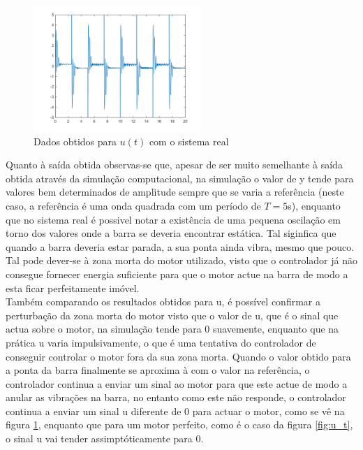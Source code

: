 \documentclass[%
  reprint,
  nofootinbib,
  amsmath,amssymb,
  aps,
  10pt,
  a4paper
]{revtex4-1}
\begin{document}
\begin{figure}[H]
\includegraphics[width=2.5in]{../img/u_dados_01.png}
\caption{Dados obtidos para $u(t)$ com o sistema real}
\label{fig:u_d}
\end{figure}
Quanto à saída obtida observas-se que, apesar de ser muito semelhante à saída obtida através da simulação computacional, na simulação o valor de y tende para valores bem determinados de amplitude sempre que se varia a referência (neste caso, a referência é uma onda quadrada com um período de $T=5$s), enquanto que no sistema real é possivel notar a existência de uma pequena oscilação em torno dos valores onde a barra se deveria encontrar estática. Tal siginfica que quando a barra deveria estar parada, a sua ponta ainda vibra, mesmo que pouco. Tal pode dever-se à zona morta do motor utilizado, visto que o controlador já não consegue fornecer energia suficiente para que o motor actue na barra de modo a esta ficar perfeitamente imóvel.\\
Também comparando os resultados obtidos para u, é possível confirmar a perturbação da zona morta do motor visto que o valor de u, que é o sinal que actua sobre o motor,  na simulação tende para 0 suavemente, enquanto que na prática u varia impulsivamente, o que é uma tentativa do controlador de conseguir controlar o motor fora da sua zona morta. Quando o valor obtido para a ponta da barra finalmente se aproxima à com o valor na referência, o controlador continua a enviar um sinal ao motor para que este actue de modo a anular as vibrações na barra, no entanto como este não responde, o controlador continua a enviar um  sinal u diferente de 0 para actuar o motor, como se vê na figura \ref{fig:u_d}, enquanto que para um motor perfeito, como é o caso da figura \ref{fig:u_t}, o sinal u vai tender assimptóticamente para 0.
\end{document}
